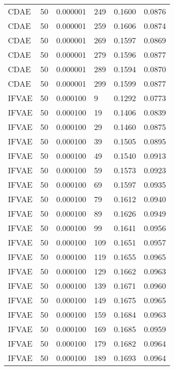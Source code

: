 \begin{tabular}{llrlrr}
    CDAE &   50 &  0.000001 &   249 &  0.1600 &       0.0876 \\
    CDAE &   50 &  0.000001 &   259 &  0.1606 &       0.0874 \\
    CDAE &   50 &  0.000001 &   269 &  0.1597 &       0.0869 \\
    CDAE &   50 &  0.000001 &   279 &  0.1596 &       0.0877 \\
    CDAE &   50 &  0.000001 &   289 &  0.1594 &       0.0870 \\
    CDAE &   50 &  0.000001 &   299 &  0.1599 &       0.0877 \\
   IFVAE &   50 &  0.000100 &     9 &  0.1292 &       0.0773 \\
   IFVAE &   50 &  0.000100 &    19 &  0.1406 &       0.0839 \\
   IFVAE &   50 &  0.000100 &    29 &  0.1460 &       0.0875 \\
   IFVAE &   50 &  0.000100 &    39 &  0.1505 &       0.0895 \\
   IFVAE &   50 &  0.000100 &    49 &  0.1540 &       0.0913 \\
   IFVAE &   50 &  0.000100 &    59 &  0.1573 &       0.0923 \\
   IFVAE &   50 &  0.000100 &    69 &  0.1597 &       0.0935 \\
   IFVAE &   50 &  0.000100 &    79 &  0.1612 &       0.0940 \\
   IFVAE &   50 &  0.000100 &    89 &  0.1626 &       0.0949 \\
   IFVAE &   50 &  0.000100 &    99 &  0.1641 &       0.0956 \\
   IFVAE &   50 &  0.000100 &   109 &  0.1651 &       0.0957 \\
   IFVAE &   50 &  0.000100 &   119 &  0.1655 &       0.0965 \\
   IFVAE &   50 &  0.000100 &   129 &  0.1662 &       0.0963 \\
   IFVAE &   50 &  0.000100 &   139 &  0.1671 &       0.0960 \\
   IFVAE &   50 &  0.000100 &   149 &  0.1675 &       0.0965 \\
   IFVAE &   50 &  0.000100 &   159 &  0.1684 &       0.0963 \\
   IFVAE &   50 &  0.000100 &   169 &  0.1685 &       0.0959 \\
   IFVAE &   50 &  0.000100 &   179 &  0.1682 &       0.0964 \\
   IFVAE &   50 &  0.000100 &   189 &  0.1693 &       0.0964 \\

\end{tabular}
